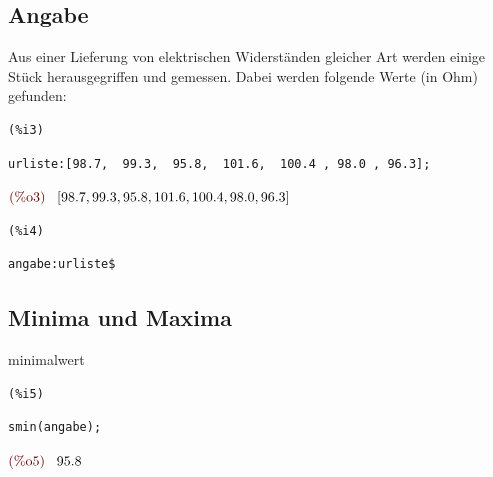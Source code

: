 \documentclass{article}
\begin{document}
\subsection{Angabe}


Aus einer Lieferung von elektrischen Widerständen gleicher Art werden einige Stück herausgegriffen und gemessen. 
Dabei werden folgende Werte (in Ohm) gefunden:

\noindent
\begin{minipage}[t]{8ex}{\color{red}\bf
\begin{verbatim}
(%i3) 
\end{verbatim}}
\end{minipage}
\begin{minipage}[t]{\textwidth}{\color{blue}
\begin{verbatim}
urliste:[98.7,  99.3,  95.8,  101.6,  100.4 , 98.0 , 96.3];
\end{verbatim}}
\end{minipage}
\begin{math}\displaystyle
\parbox{8ex}{\color{labelcolor}(\%o3) }
[98.7,99.3,95.8,101.6,100.4,98.0,96.3]
\end{math}


\noindent
\begin{minipage}[t]{8ex}{\color{red}\bf
\begin{verbatim}
(%i4) 
\end{verbatim}}
\end{minipage}
\begin{minipage}[t]{\textwidth}{\color{blue}
\begin{verbatim}
angabe:urliste$
\end{verbatim}}
\end{minipage}


\subsection{Minima und Maxima}


minimalwert

\noindent
\begin{minipage}[t]{8ex}{\color{red}\bf
\begin{verbatim}
(%i5) 
\end{verbatim}}
\end{minipage}
\begin{minipage}[t]{\textwidth}{\color{blue}
\begin{verbatim}
smin(angabe);
\end{verbatim}}
\end{minipage}
\begin{math}\displaystyle
\parbox{8ex}{\color{labelcolor}(\%o5) }
95.8
\end{math}
\end{document}
